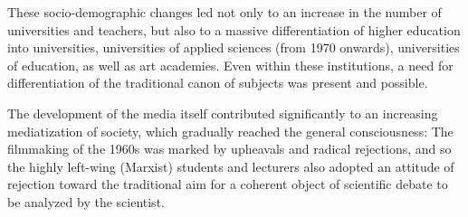 \documentclass{tufte-handout}
\begin{document}
These socio-demographic changes led not only to an increase in the
number of universities and teachers, but also to a massive
differentiation of higher education into universities, universities of
applied sciences (from 1970 onwards), universities of education, as well
as art academies. Even within these institutions, a need for
differentiation of the traditional canon of subjects was present and
possible.

The development of the media itself contributed significantly to an
increasing mediatization of society, which gradually reached the general
consciousness: The filmmaking of the 1960s was marked by upheavals and
radical rejections, and so the highly left-wing (Marxist) students and
lecturers also adopted an attitude of rejection toward the traditional
aim for a coherent object of scientific debate to be analyzed by the
scientist.
\end{document}
